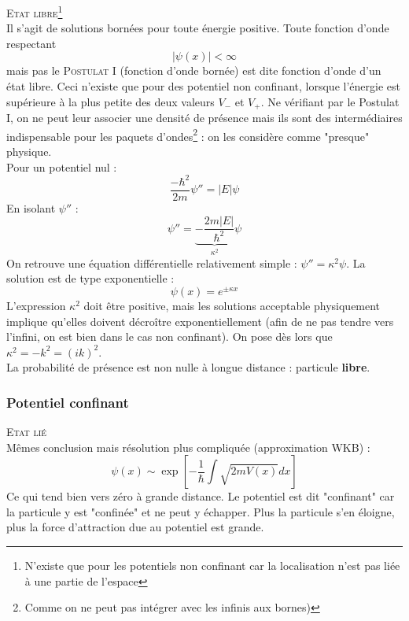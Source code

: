 \documentclass	[11pt, a4paper, openany]{book}
\begin{document}
	\textsc{Etat libre}\footnote{N'existe que pour les potentiels non confinant car la localisation n'est pas liée à une partie de l'espace}\\
	Il s'agit de solutions bornées pour toute énergie positive. Toute fonction d'onde respectant 
	\begin{equation}
		|\psi(x)| < \infty
	\end{equation}
	mais pas le \textsc{Postulat I} (fonction d'onde bornée) est dite fonction d'onde d'un état libre. Ceci n'existe que pour des potentiel non confinant, lorsque l'énergie est supérieure à la plus petite des deux valeurs $V_-$ et $V_+$. Ne vérifiant par le Postulat I, on ne peut leur associer une densité de présence mais ils sont des intermédiaires indispensable pour les paquets d'ondes\footnote{Comme on ne peut pas intégrer avec les infinis aux bornes)} : on les considère comme "presque" physique. \\
	Pour un potentiel nul :
	\begin{equation}
		\frac{-\hbar^2}{2m}\psi'' = |E|\psi
	\end{equation}
	En isolant $\psi''$ :
	\begin{equation}
		\psi'' = \underbrace{-\dfrac{2m|E|}{\hbar^2}}_{\kappa^2}\psi
	\end{equation}
	On retrouve une équation différentielle relativement simple : $\psi'' = \kappa^2\psi$. La solution est de type exponentielle :
	\begin{equation}
		\psi(x) = e^{\pm \kappa x}
	\end{equation}
	L'expression $\kappa^2$ doit être positive, mais les solutions acceptable physiquement implique qu'elles doivent décroître exponentiellement (afin de ne pas tendre vers l'infini, on est bien dans le cas non confinant). On pose dès lors que $\kappa^2 = -k^2 = (ik)^2$.\\
	La probabilité de présence est non nulle à longue distance : particule \textbf{libre}.
	
	
	\subsubsection*{Potentiel confinant}
	\textsc{Etat lié}\\
	Mêmes conclusion mais résolution plus compliquée (approximation WKB) :
	\begin{equation}
		\psi(x) \sim \exp\left[ -\frac{1}{\hbar}\int\sqrt{2mV(x)}dx\right]
	\end{equation}
	Ce qui tend bien vers zéro à grande distance. Le potentiel est dit "confinant" car la particule y est "confinée" et ne peut y échapper. Plus la particule s'en éloigne, plus la force d'attraction due au potentiel est grande.
	
\end{document}
